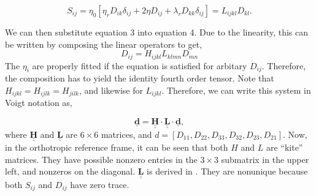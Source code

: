\documentclass{article}
\begin{document}
\begin{equation}
   S_{ij} =\eta_0 \left[\eta_r D_{ik} \delta_{ij} +  2 \eta D_{ij} + \lambda_r D_{kk} \delta_{ij} \right]  = L_{ijkl} D_{kl}.
\end{equation}
   
We can then substitute equation 3 into equation 4. Due to the linearity, this can be written by composing the linear operators to get,
\begin{equation}
   D_{ij} = H_{ijkl} L_{klmn} D_{mn}
\end{equation}
The $\eta_i$ are properly fitted if the equation is satisfied for arbitary $D_{ij}$. Therefore, the composition has to yield the identity fourth order tensor. Note that $H_{ijkl}=H_{ijlk}=H_{jilk}$, and likewise for $L_{ijkl}$. Therefore, we can write this system in Voigt notation as,

\begin{equation}
   \underline{\mathbf{d}} = \underline{\underline{\mathbf{H}}} \cdot \underline{\underline{\mathbf{L}}} \cdot \underline{\mathbf{d}},
\end{equation}
where $\underline{\underline{\mathbf{H}}}$ and  $\underline{\underline{\mathbf{L}}}$  are $6 \times 6$ matrices, and $d = [D_{11},D_{22},D_{33},D_{32},D_{23},D_{21}]$. Now, in the orthotropic reference frame, it can be seen that both $H$ and $L$ are ``kite'' matrices. They have possible nonzero entries in the $3 \times 3$ submatrix in the upper left, and nonzeros on the diagonal. $\underline{\underline{\mathbf{L}}}$ is derived in \citet{gillet2005}. They are nonunique because both $S_{ij}$ and $D_{ij}$ have zero trace.  
\end{document}
